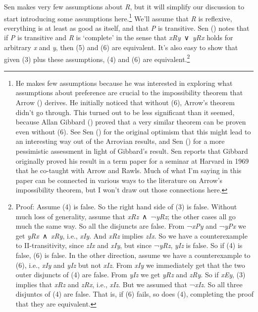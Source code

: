 \documentclass[
  10.5pt,
  twoside]{article}
\begin{document}
Sen makes very few assumptions about \emph{R}, but it will simplify our
discussion to start introducing some assumptions here.\footnote{He makes
  few assumptions because he was interested in exploring what
  assumptions about preference are crucial to the impossibility theorem
  that Arrow () derives. He initially
  noticed that without (6), Arrow's theorem didn't go through. This
  turned out to be less significant than it seemed, because Allan
  Gibbard () proved that a very similar
  theorem can be proven even without (6). See Sen
  () for the original optimism that this
  might lead to an interesting way out of the Arrovian results, and Sen
  () for a more pessimistic
  assessment in light of Gibbard's result. Sen reports that Gibbard
  originally proved his result in a term paper for a seminar at Harvard
  in 1969 that he co-taught with Arrow and Rawls. Much of what I'm
  saying in this paper can be connected in various ways to the
  literature on Arrow's impossibility theorem, but I won't draw out
  those connections here.} We'll assume that \emph{R} is reflexive,
everything is at least as good as itself, and that \emph{P} is
transitive. Sen () notes
that if \emph{P} is transitive and \emph{R} is `complete' in the sense
that \emph{xRy}~∨~\emph{yRx} holds for arbitrary \emph{x} and \emph{y},
then (5) and (6) are equivalent. It's also easy to show that given (3)
plus these assumptions, (4) and (6) are equivalent.\footnote{Proof:
  Assume (4) is false. So the right hand side of (3) is false. Without
  much loss of generality, assume that \emph{xRz}~∧~¬\emph{yRz}; the
  other cases all go much the same way. So all the disjuncts are false.
  From ¬\emph{xPy} and ¬\emph{yPx} we get \emph{yRx}~∧~\emph{xRy}, i.e.,
  \emph{xIy}. And \emph{xRz} implies \emph{zIx}. So we have a
  counterexample to II-transitivity, since \emph{zIx} and \emph{xIy},
  but since ¬\emph{yRz}, \emph{yIz} is false. So if (4) is false, (6) is
  false. In the other direction, assume we have a counterexample to (6),
  i.e., \emph{xIy} and \emph{yIz} but not \emph{xIz}. From \emph{xIy} we
  immediately get that the two outer disjuncts of (4) are false. From
  \emph{yIz} we get \emph{yRz} and \emph{zRy}. So if \emph{xEy}, (3)
  implies that \emph{xRz} and \emph{zRx}, i.e., \emph{xIz}. But we
  assumed that ¬\emph{xIz}. So all three disjuntcs of (4) are false.
  That is, if (6) fails, so does (4), completing the proof that they are
  equivalent.}
\end{document}
